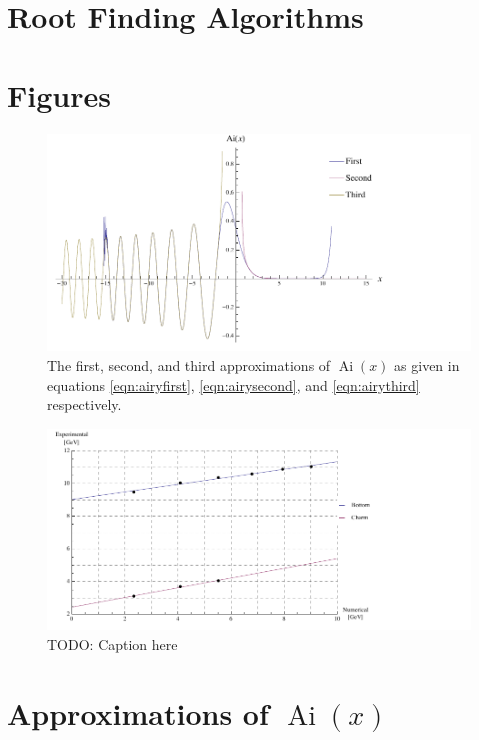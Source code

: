 \documentclass[]{article}
\newcommand{\Ai}[1]{\ensuremath{\operatorname{Ai}({#1})}}
\begin{document}
\section{Root Finding Algorithms}\label{sec:algorithms}


\section{Figures}\label{sec:figures}

\begin{figure}[H]
	\hspace*{-0.15\textwidth}
	\centering
	\includegraphics[scale=1.3]{approximations}
	\caption{The first, second, and third approximations of \Ai{x} as given in equations \ref{eqn:airyfirst}, \ref{eqn:airysecond}, and \ref{eqn:airythird} respectively.}
	\label{fig:approximations}
\end{figure}

\begin{figure}[H]
	\hspace*{-0.15\textwidth}
	\centering
	\includegraphics[scale=1.3]{experimental-numerical}
	\caption{TODO: Caption here}
	\label{fig:data}
\end{figure}


\appendix
\section{Approximations of \Ai{x}}\label{app:approximations}
\end{document}
